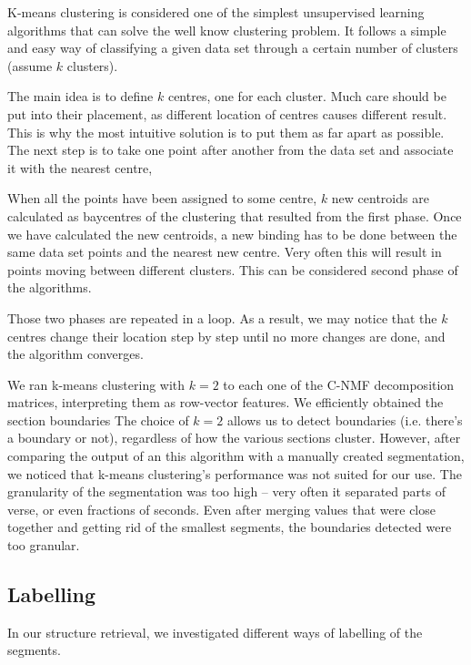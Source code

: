 K-means clustering is considered one of the simplest unsupervised learning algorithms that can solve the well know clustering problem. It follows a simple and easy way of classifying a given data set through a certain number of clusters (assume $k$ clusters).

The main idea  is to define $k$ centres, one for each cluster. Much care should be put into their placement, as different location of centres causes different result. This is why the most intuitive solution is to put them as far apart as possible. The next step is to take one point after another from the data set and associate it with the nearest centre, 

When all the points have been assigned to some centre, $k$ new centroids are calculated as baycentres of the clustering that resulted from the first phase. Once we have calculated the new centroids, a new binding has to be done  between the same data set points and the nearest new centre. Very often this will result in points moving between different clusters. This can be considered second phase of the algorithms. 

Those two phases are repeated in a loop. As a result, we may notice that the $k$ centres change their location step by step until no more changes are done, and the algorithm converges. 

We ran k-means clustering with $k = 2$ to each one of the C-NMF decomposition matrices, interpreting them as row-vector features. We efficiently obtained the section boundaries The choice of $k = 2$ allows us to detect boundaries (i.e. there’s a boundary or not), regardless of how the various sections cluster. However, after comparing the output of an this algorithm with a manually created segmentation, we noticed that k-means clustering's performance was not suited for our use. The granularity of the segmentation was too high -- very often it separated parts of verse, or even fractions of seconds. Even after merging values that were close together and getting rid of the smallest segments, the boundaries detected were too granular.

\vspace{10pt}


\subsection{Labelling}

In our structure retrieval, we investigated different ways of labelling of the segments.

